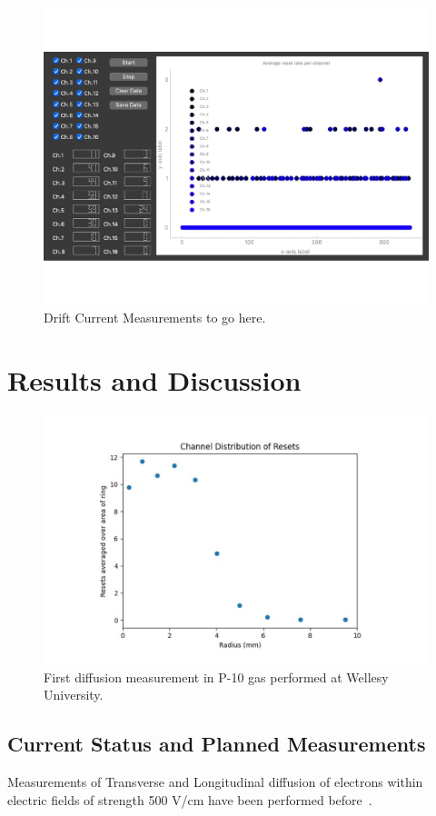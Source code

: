 \begin{figure}[]
\centering
\includegraphics[width=\textwidth]{images/SAQ_gui_resets.pdf}
\caption{Drift Current Measurements to go here.}
\label{fig:saq_drift_gui}
\end{figure}

\section{Results and Discussion}

\begin{figure}[]
\centering
\includegraphics[width=\textwidth]{images/SAQ_first_diffusion_measurement.pdf}
\caption{First diffusion measurement in P-10 gas performed at Wellesy University.}
\label{fig:saq_first_diffusion_measurement}
\end{figure}

\subsection{Current Status and Planned Measurements}

Measurements of Transverse and Longitudinal diffusion of electrons within electric fields of strength 500 V/cm have been performed before~\citep{lar_diffusion_measurement_LI2016160}.
